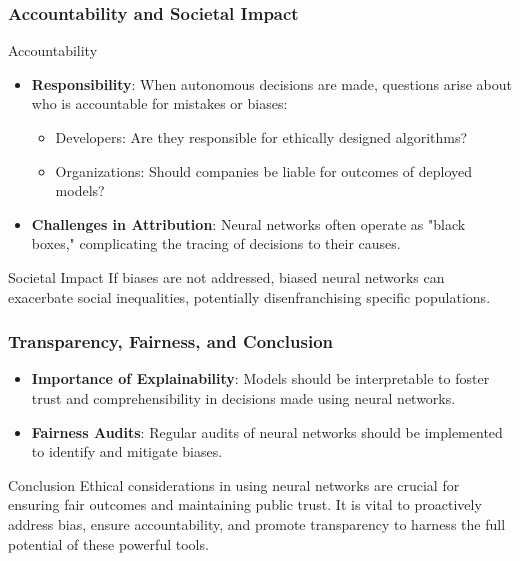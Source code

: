 \documentclass[aspectratio=169]{beamer}
\begin{document}
\begin{frame}[fragile]
  \frametitle{Accountability and Societal Impact}
  \begin{block}{Accountability}
    \begin{itemize}
      \item \textbf{Responsibility}:
        When autonomous decisions are made, questions arise about who is accountable for mistakes or biases:
        \begin{itemize}
          \item Developers: Are they responsible for ethically designed algorithms?
          \item Organizations: Should companies be liable for outcomes of deployed models?
        \end{itemize}
  
      \item \textbf{Challenges in Attribution}:
        Neural networks often operate as "black boxes," complicating the tracing of decisions to their causes.
    \end{itemize}
  \end{block}

  \begin{block}{Societal Impact}
    If biases are not addressed, biased neural networks can exacerbate social inequalities, potentially disenfranchising 
    specific populations.
  \end{block}
\end{frame}

\begin{frame}[fragile]
  \frametitle{Transparency, Fairness, and Conclusion}
  \begin{itemize}
    \item \textbf{Importance of Explainability}:
      Models should be interpretable to foster trust and comprehensibility in decisions made using neural networks.
  
    \item \textbf{Fairness Audits}:
      Regular audits of neural networks should be implemented to identify and mitigate biases.
  \end{itemize}

  \begin{block}{Conclusion}
    Ethical considerations in using neural networks are crucial for ensuring fair outcomes and maintaining public trust. 
    It is vital to proactively address bias, ensure accountability, and promote transparency to harness the full potential of 
    these powerful tools.
  \end{block}
\end{frame}
\end{document}

